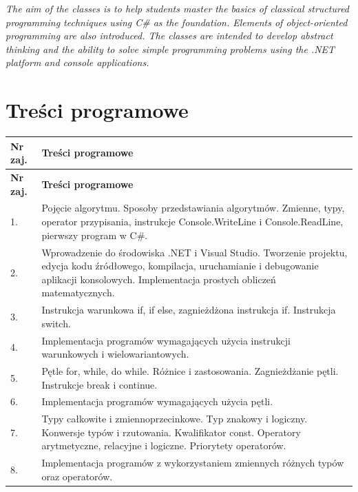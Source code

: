 \documentclass[12pt, a4paper]{article}
\newcommand{\thdrule}{\noalign{\global\setlength{\extrarowheight}{0pt}}}
\newcommand{\thdend}{\noalign{\global\setlength{\extrarowheight}{3pt}}}
\begin{document}
\textit{The aim of the classes is to help students master the basics of classical structured programming techniques using C\# as the foundation. Elements of object-oriented programming are also introduced. The classes are intended to develop abstract thinking and the ability to solve simple programming problems using the .NET platform and console applications.}


\section{Treści programowe}

{\scriptsize
\begin{longtable}{m{1.5cm}m{14.5cm}}
\thdrule\toprule
\rowcolor{pjatkRed} {\color{white}\textbf{Nr zaj.}} & {\color{white}\textbf{Treści programowe}} \\
\midrule\thdend
\endfirsthead
\thdrule\toprule
\rowcolor{pjatkRed} {\color{white}\textbf{Nr zaj.}} & {\color{white}\textbf{Treści programowe}} \\
\midrule\thdend
\endhead
  \rowcolor{tableRowLight} 1. & Pojęcie algorytmu. Sposoby przedstawiania algorytmów. Zmienne, typy, operator przypisania, instrukcje Console.WriteLine i Console.ReadLine, pierwszy program w C\#. \\
  \rowcolor{tableRowAlt} 2. & Wprowadzenie do środowiska .NET i Visual Studio. Tworzenie projektu, edycja kodu źródłowego, kompilacja, uruchamianie i debugowanie aplikacji konsolowych. Implementacja prostych obliczeń matematycznych. \\
  \rowcolor{tableRowLight} 3. & Instrukcja warunkowa if, if else, zagnieżdżona instrukcja if. Instrukcja switch. \\
  \rowcolor{tableRowAlt} 4. & Implementacja programów wymagających użycia instrukcji warunkowych i wielowariantowych. \\
  \rowcolor{tableRowLight} 5. & Pętle for, while, do while. Różnice i zastosowania. Zagnieżdżanie pętli. Instrukcje break i continue. \\
  \rowcolor{tableRowAlt} 6. & Implementacja programów wymagających użycia pętli. \\
  \rowcolor{tableRowLight} 7. & Typy całkowite i zmiennoprzecinkowe. Typ znakowy i logiczny. Konwersje typów i rzutowania. Kwalifikator const. Operatory arytmetyczne, relacyjne i logiczne. Priorytety operatorów. \\
  \rowcolor{tableRowAlt} 8. & Implementacja programów z wykorzystaniem zmiennych różnych typów oraz operatorów. \\

\end{longtable}}
\end{document}
